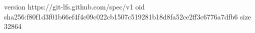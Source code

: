 version https://git-lfs.github.com/spec/v1
oid sha256:f80f1d3f01b66ef4f4c09c022cb1507c519281b18d8fa52ce2ff3c6776a7dfb6
size 32864
